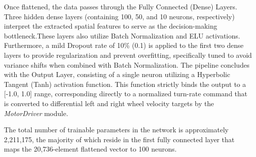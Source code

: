 Once flattened, the data passes through the Fully Connected (Dense) Layers. Three hidden dense layers (containing 100, 50, and 10 neurons, respectively) interpret the extracted spatial features to serve as the decision-making bottleneck.These layers also utilize Batch Normalization and ELU activations. 
Furthermore, a mild Dropout rate of 10\% (0.1) is applied to the first two dense layers to provide regularization and prevent overfitting, specifically tuned to avoid variance shifts when combined with Batch Normalization. The pipeline concludes with the Output Layer, consisting of a single neuron utilizing a Hyperbolic Tangent (Tanh) activation function. This function strictly binds the output to a [-1.0, 1.0] range, corresponding directly to a normalized turn-rate command that is
converted to differential left and right wheel velocity targets
by the \textit{MotorDriver} module.

The total number of trainable parameters in the network is approximately
2{,}211{,}175, the majority of which reside in the first fully connected
layer that maps the 20{,}736-element flattened vector to 100 neurons.

\begin{table}[h!]
\centering
\renewcommand{\arraystretch}{1.3}
\caption{Modified DAVE-2 Convolutional Neural Network Architecture}
\label{tab:architecture}
\end{table}

